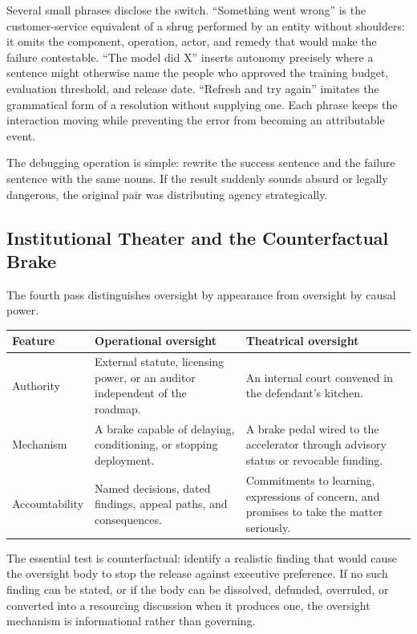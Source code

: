 \documentclass[11pt]{article}
\begin{document}
Several small phrases disclose the switch. \enquote{Something went wrong} is the customer-service equivalent of a shrug performed by an entity without shoulders: it omits the component, operation, actor, and remedy that would make the failure contestable. \enquote{The model did X} inserts autonomy precisely where a sentence might otherwise name the people who approved the training budget, evaluation threshold, and release date. \enquote{Refresh and try again} imitates the grammatical form of a resolution without supplying one. Each phrase keeps the interaction moving while preventing the error from becoming an attributable event.

The debugging operation is simple: rewrite the success sentence and the failure sentence with the same nouns. If the result suddenly sounds absurd or legally dangerous, the original pair was distributing agency strategically.

\subsection{Institutional Theater and the Counterfactual Brake}

The fourth pass distinguishes oversight by appearance from oversight by causal power.

\begin{center}
\small
\begin{tabularx}{\textwidth}{@{}p{}XX@{}}
\toprule
\textbf{Feature} & \textbf{Operational oversight} & \textbf{Theatrical oversight} \\
\midrule
Authority & External statute, licensing power, or an auditor independent of the roadmap. & An internal court convened in the defendant's kitchen. \\
Mechanism & A brake capable of delaying, conditioning, or stopping deployment. & A brake pedal wired to the accelerator through advisory status or revocable funding. \\
Accountability & Named decisions, dated findings, appeal paths, and consequences. & Commitments to learning, expressions of concern, and promises to take the matter seriously. \\
\bottomrule
\end{tabularx}
\end{center}

The essential test is counterfactual: identify a realistic finding that would cause the oversight body to stop the release against executive preference. If no such finding can be stated, or if the body can be dissolved, defunded, overruled, or converted into a resourcing discussion when it produces one, the oversight mechanism is informational rather than governing.
\end{document}
